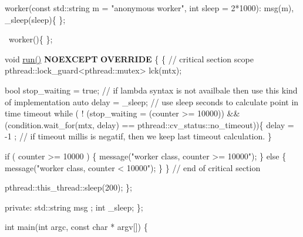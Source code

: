 \begin{DoxyPre}{\ttfamily   worker(const std::string m = "anonymous worker", int sleep = 2*1000): msg(m), \_sleep(sleep)\{
  \};}\end{DoxyPre}



\begin{DoxyPre}{\ttfamily   ~worker()\{
  \};}\end{DoxyPre}



\begin{DoxyPre}{\ttfamily   void \hyperlink{classpthread_1_1runnable_a68ce0e65d5714457bcf3f5ef38b33fa7}{run()} {\bfseries NOEXCEPT} {\bfseries OVERRIDE} \{
    \{ // critical section scope
      pthread::lock\_guard<pthread::mutex> lck(mtx);}\end{DoxyPre}



\begin{DoxyPre}{\ttfamily       bool stop\_waiting = true; // if lambda syntax is not availbale then use this kind of implementation
      auto delay = \_sleep; // use sleep seconds to calculate point in time timeout
      while ( ! (stop\_waiting = (counter >= 10000)) \&\& (condition.wait\_for(mtx, delay) == pthread::cv\_status::no\_timeout))\{
        delay = -1 ; // if timeout millis is negatif, then we keep last timeout calculation.
      \}}\end{DoxyPre}



\begin{DoxyPre}{\ttfamily       if ( counter >= 10000 ) \{
        message("worker class, counter >= 10000");
      \} else \{
        message("worker class, counter < 10000");
      \}
    \} // end of critical section}\end{DoxyPre}



\begin{DoxyPre}{\ttfamily     pthread::this\_thread::sleep(200);
  \};}\end{DoxyPre}



\begin{DoxyPre}{\ttfamily private:
  std::string    msg ;
  int            \_sleep;
\};}\end{DoxyPre}



\begin{DoxyPre}{\ttfamily int main(int argc, const char * argv[]) \{}\end{DoxyPre}



